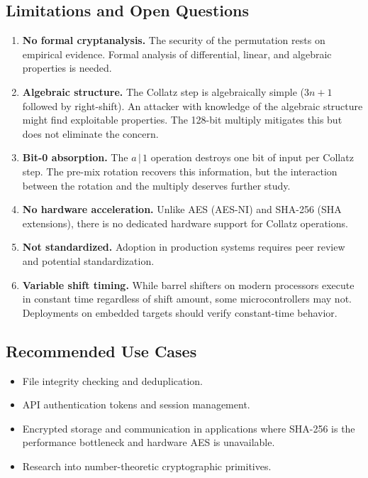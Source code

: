 \documentclass[11pt,a4paper]{article}
\begin{document}
\subsection{Limitations and Open Questions}

\begin{enumerate}
    \item \textbf{No formal cryptanalysis.} The security of the
          permutation rests on empirical evidence. Formal analysis of
          differential, linear, and algebraic properties is needed.
    \item \textbf{Algebraic structure.} The Collatz step is
          algebraically simple ($3n+1$ followed by right-shift). An
          attacker with knowledge of the algebraic structure might find
          exploitable properties. The 128-bit multiply mitigates this but
          does not eliminate the concern.
    \item \textbf{Bit-0 absorption.} The $a \,|\, 1$ operation destroys
          one bit of input per Collatz step. The pre-mix rotation
          recovers this information, but the interaction between the
          rotation and the multiply deserves further study.
    \item \textbf{No hardware acceleration.} Unlike AES (AES-NI) and
          SHA-256 (SHA extensions), there is no dedicated hardware
          support for Collatz operations.
    \item \textbf{Not standardized.} Adoption in production systems
          requires peer review and potential standardization.
    \item \textbf{Variable shift timing.} While barrel shifters on
          modern processors execute in constant time regardless of shift
          amount, some microcontrollers may not. Deployments on embedded
          targets should verify constant-time behavior.
\end{enumerate}

\subsection{Recommended Use Cases}

\begin{itemize}
    \item File integrity checking and deduplication.
    \item API authentication tokens and session management.
    \item Encrypted storage and communication in applications where
          SHA-256 is the performance bottleneck and hardware AES is
          unavailable.
    \item Research into number-theoretic cryptographic primitives.
\end{itemize}
\end{document}

